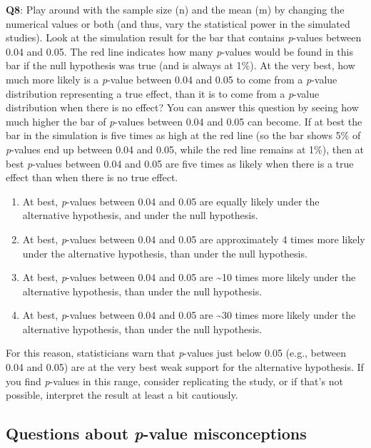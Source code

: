 \documentclass[
  oneside]{book}
\providecommand{\tightlist}{%
  \setlength{\itemsep}{0pt}\setlength{\parskip}{0pt}}
\begin{document}
\textbf{Q8}: Play around with the sample size (n) and the mean (m) by changing the numerical values or both (and thus, vary the statistical power in the simulated studies). Look at the simulation result for the bar that contains \emph{p}-values between 0.04 and 0.05. The red line indicates how many \emph{p}-values would be found in this bar if the null hypothesis was true (and is always at 1\%). At the very best, how much more likely is a \emph{p}-value between 0.04 and 0.05 to come from a \emph{p}-value distribution representing a true effect, than it is to come from a \emph{p}-value distribution when there is no effect? You can answer this question by seeing how much higher the bar of \emph{p}-values between 0.04 and 0.05 can become. If at best the bar in the simulation is five times as high at the red line (so the bar shows 5\% of \emph{p}-values end up between 0.04 and 0.05, while the red line remains at 1\%), then at best \emph{p}-values between 0.04 and 0.05 are five times as likely when there is a true effect than when there is no true effect.

\begin{enumerate}
\def\labelenumi{\Alph{enumi})}
\tightlist
\item
  At best, \emph{p}-values between 0.04 and 0.05 are equally likely under the
  alternative hypothesis, and under the null hypothesis.
\item
  At best, \emph{p}-values between 0.04 and 0.05 are approximately 4 times more
  likely under the alternative hypothesis, than under the null hypothesis.
\item
  At best, \emph{p}-values between 0.04 and 0.05 are \textasciitilde10 times more likely under the alternative hypothesis, than under the null hypothesis.
\item
  At best, \emph{p}-values between 0.04 and 0.05 are \textasciitilde30 times more likely under the alternative hypothesis, than under the null hypothesis.
\end{enumerate}

For this reason, statisticians warn that \emph{p}-values just below 0.05 (e.g.,
between 0.04 and 0.05) are at the very best weak support for the alternative
hypothesis. If you find \emph{p}-values in this range, consider replicating the
study, or if that's not possible, interpret the result at least a bit
cautiously.

\hypertarget{questions-about-p-value-misconceptions}{%
\subsection{\texorpdfstring{Questions about \emph{p}-value misconceptions}{Questions about p-value misconceptions}}\label{questions-about-p-value-misconceptions}}
\end{document}
